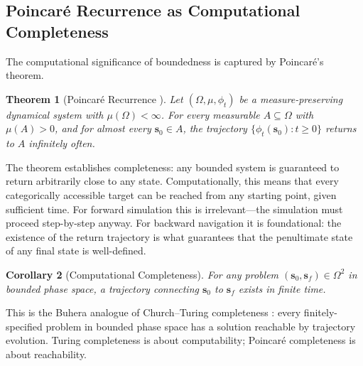 \documentclass[twocolumn,11pt,a4paper]{article}
\newtheorem{theorem}{Theorem}[section]
\newtheorem{corollary}[theorem]{Corollary}
\begin{document}
\subsection{Poincar\'e Recurrence as Computational Completeness}

The computational significance of boundedness is captured by Poincar\'e's theorem.

\begin{theorem}[Poincar\'e Recurrence \citep{poincare1890probleme}]
\label{thm:poincare}
Let $(\Omega, \mu, \phi_t)$ be a measure-preserving dynamical system with $\mu(\Omega) < \infty$. For every measurable $A \subseteq \Omega$ with $\mu(A) > 0$, and for almost every $\mathbf{s}_0 \in A$, the trajectory $\{\phi_t(\mathbf{s}_0) : t \geq 0\}$ returns to $A$ infinitely often.
\end{theorem}

The theorem establishes completeness: any bounded system is guaranteed to return arbitrarily close to any state. Computationally, this means that every categorically accessible target can be reached from any starting point, given sufficient time. For forward simulation this is irrelevant---the simulation must proceed step-by-step anyway. For backward navigation it is foundational: the existence of the return trajectory is what guarantees that the penultimate state of any final state is well-defined.

\begin{corollary}[Computational Completeness]
For any problem $(\mathbf{s}_0, \mathbf{s}_f) \in \Omega^2$ in bounded phase space, a trajectory connecting $\mathbf{s}_0$ to $\mathbf{s}_f$ exists in finite time.
\end{corollary}

This is the Buhera analogue of Church--Turing completeness \cite{turing1936computable,sipser2012introduction}: every finitely-specified problem in bounded phase space has a solution reachable by trajectory evolution. Turing completeness is about computability; Poincar\'e completeness is about reachability.
\end{document}
